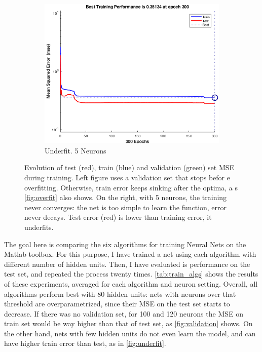 \documentclass[a4paper, 10pt]{article}
\begin{document}
\begin{figure}[h]
\begin{adjustwidth}{-1.1cm}{-1.1cm}
    \begin{subfigure}[t]{0.3\linewidth}
      \includegraphics[width=1\linewidth]{./lab1/underfit.png}
      \caption{Underfit. 5 Neurons}
      \label{fig:underfit}
    \end{subfigure}
    \end{adjustwidth}
    \caption{Evolution of test (red), train (blue) and validation (green) set 
      MSE during training.  Left figure uses a validation set that stops befor
      e overfitting.  Otherwise, train error keeps sinking after the optima, a
      s \autoref{fig:overfit} also shows. On the right, with 5 neurons, the 
      training never converges: the net is too simple to learn the function, 
      error never decays. Test error (red) is lower than training error, it
      underfits.}
    \label{fig:validation}
  \end{figure}


  The goal here is comparing the six algorithms for training Neural Nets on
  the Matlab toolbox. For this purpose, I have trained a net using each 
  algorithm with different number of hidden units. Then, I have evaluated
  is performance on the test set, and repeated the process twenty times. 
  \autoref{tab:train_algs} shows the results of these experiments, averaged for
  each algorithm and neuron setting. Overall, all algorithms perform best
  with 80 hidden units: nets with neurons over that threshold 
  are overparametrized, since their MSE on the test set starts to decrease. 
  If there was no validation set, for 100 and 120 neurons the MSE on 
  train set would be way higher than that of test set, as
  \autoref{fig:validation} shows. On the other hand, nets with few hidden units
  do not even learn the model, and can have higher train error than test, as in
  \autoref{fig:underfit}.
\end{document}
